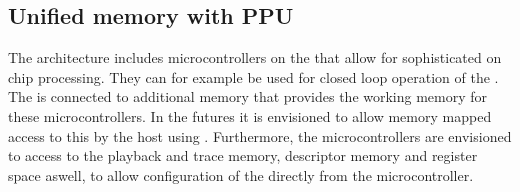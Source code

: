 \subsection{Unified memory with PPU}
The \BSSTwo{} architecture includes microcontrollers on the \ASIC{} that allow for sophisticated on chip processing. They can for example be used for closed loop operation of the \ASIC{}. The \FPGA{} is connected to additional \DDR{} memory that provides the working memory for these microcontrollers. In the futures it is envisioned to allow memory mapped access to this \DDR{} by the host using \FAXI{}. Furthermore, the microcontrollers are envisioned to access to the playback and trace memory, descriptor memory and \AXIDMA{} register space aswell, to allow configuration of the directly from the microcontroller.

